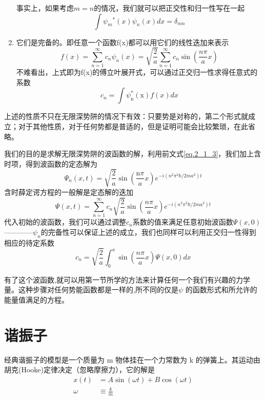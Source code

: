 \begin{enumerate}
		   事实上，如果考虑$m=n$的情况，我们就可以把正交性和归一性写在一起
		   \begin{equation}
				\boxed{\int \psi_{m}{ }^{*}(x) \psi_{n}(x) d x=\delta_{m n}}
		   \end{equation}
	\item 它们是完备的。即任意一个函数f(x)都可以用它们的线性迭加来表示
			\begin{equation}
				f(x)=\sum_{n=1}^{\infty} c_{n} \psi_{n}(x)=\sqrt{\frac{2}{a}} \sum_{n=1}^{\infty} c_{n} \sin \left(\frac{n \pi}{a} x\right)
			\end{equation}
			不难看出，上式即为f(x)的傅立叶展开式，可以通过正交归一性求得任意式的系数
			\begin{equation}
				\boxed{c_{n}=\int \psi_{\mathrm{n}}^{*}(\mathrm{x}) f(x) d x}
			\end{equation}
	\end{enumerate}

	上述的性质不只在无限深势阱的情况下有效：只要势是对称的，第二个形式就成立；对于其他性质，对于任何势都是普适的，但是证明可能会比较繁琐，在此省略。

	我们的目的是求解无限深势阱的波函数的解，利用前文式\ref{eq.2_1_3}，我们加上含时项，得到波函数的定态解为
	\begin{equation}
		\Psi_{n}(x, t)=\sqrt{\frac{2}{a}} \sin \left(\frac{\mathrm{n} \pi}{a} x\right) e^{-i\left(n^{2} \pi^{2} \hbar / 2 m a^{2}\right) t}
	\end{equation}
	含时薛定谔方程的一般解是定态解的迭加
	\begin{equation}
		\Psi(x, t)=\sum_{n=1}^{\infty} c_{n} \sqrt{\frac{2}{a}} \sin \left(\frac{n \pi}{a} x\right) e^{-i\left(n^{2} \pi^{2} \hbar / 2 m a^{2}\right) t}
	\end{equation}
	代入初始的波函数，我们可以通过调整$c_n$系数的值来满足任意初始波函数$\Psi(x,0)$————${\psi_n}$的完备性可以保证上述的成立，我们也同样可以利用正交归一性得到相应的待定系数
	\begin{equation}
		c_{n}=\sqrt{\frac{2}{a}} \int_{0}^{a} \sin \left(\frac{n \pi}{a} x\right) \Psi(x, 0) d x
	\end{equation}

	有了这个波函数,就可以用第一节所学的方法来计算任何一个我们有兴趣的力学量。这种步骤对任何势能函数都是一样的,所不同的仅是$\psi$ 的函数形式和所允许的能量值满足的方程。
\section{谐振子}
	经典谐振子的模型是一个质量为 m 物体挂在一个力常数为 k 的弹簧上。其运动由胡克(Hooke)定律决定（忽略摩擦力），它的解是
	\begin{align}
		x(t)&=A \sin (\omega t)+B \cos (\omega t) \\
		\omega &\equiv \frac{k}{m}
	\end{align}

